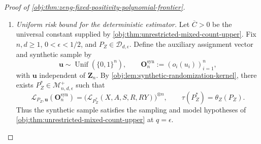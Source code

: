 \begin{proof}[Proof of \cref{obj:thm:zeng-fixed-positivity-polynomial-frontier}]
\begin{enumerate}
\item \textit{Uniform risk bound for the deterministic estimator.}
Let \(\overline C>0\) be the universal constant supplied by
\cref{obj:thm:unrestricted-mixed-count-upper}. Fix \(n,d\ge1\),
\(0<\epsilon<1/2\), and \(P_Z\in\mathcal D_{d,\epsilon}\).
Define the auxiliary assignment vector and synthetic sample by
\[
\mathbf u\sim\operatorname{Unif}(\{0,1\}^n),
\qquad
\mathbf O_n^{\mathrm{syn}}
:=(o_i(u_i))_{i=1}^n,
\]
with \(\mathbf u\) independent of \(\mathbf Z_n\).
By \cref{obj:lem:synthetic-randomization-kernel}, there exists
\(P_Z^*\in\mathcal M^+_{n,d,\epsilon}\) such that
\[
\mathcal L_{P_Z,\mathbf u}(\mathbf O_n^{\mathrm{syn}})
=
\bigl(\mathcal L_{P_Z^*}(X,A,S,R,RY)\bigr)^{\otimes n},
\qquad
\tau(P_Z^*)=\theta_Z(P_Z).
\]
Thus the synthetic sample satisfies the sampling and model hypotheses of
\cref{obj:thm:unrestricted-mixed-count-upper} at \(q=\epsilon\).


\end{enumerate}
\end{proof}
